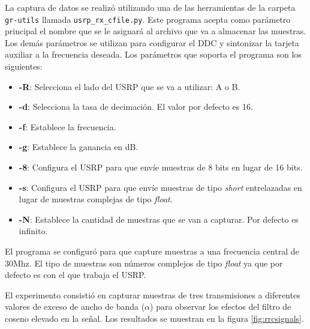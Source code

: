 La captura de datos se realiz\'o utilizando una de las herramientas de la carpeta \verb|gr-utils|
llamada \verb|usrp_rx_cfile.py|. Este programa acepta como par\'ametro principal el nombre que se le
asignar\'a al archivo que va a almacenar las muestras. Los dem\'as par\'ametros se utilizan para
configurar el DDC y sintonizar la tarjeta auxiliar a la frecuencia deseada. Los par\'ametros que
soporta el programa son los siguientes:

\begin{itemize}
  \item \textbf{-R}: Selecciona el lado del USRP que se va a utilizar: A o B.
  \item \textbf{-d}: Selecciona la tasa de decimaci\'on. El valor por defecto es 16.
  \item \textbf{-f}: Establece la frecuencia.
  \item \textbf{-g}: Establece la ganancia en dB.
  \item \textbf{-8}: Configura el USRP para que env\'ie muestras de 8 bits en lugar de 16 bits.
  \item \textbf{-s}: Configura el USRP para que env\'ie muestras de tipo \emph{short} entrelazadas
  en lugar de muestras complejas de tipo \emph{float}.
  \item \textbf{-N}: Establece la cantidad de muestras que se van a capturar. Por defecto es
  infinito.
\end{itemize}

El programa se configur\'o para que capture muestras a una frecuencia central de 30Mhz. El tipo de
muestras son n\'umeros complejos de tipo \emph{float} ya que por defecto es con el que trabaja el USRP.

El experimento consisti\'o en capturar muestras de tres transmisiones a diferentes valores de exceso
de ancho de banda ($\alpha$) para observar los efectos del filtro de coseno elevado en la se\~nal.
Los resultados se muestran en la figura \ref{fig:rrcsignals}.

